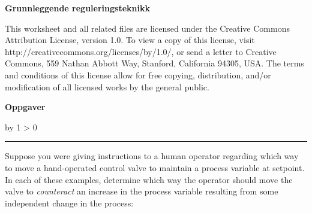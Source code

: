 \documentclass[12pt,a4paper]{article}
\def\oppgave{
            \advance\questnum by 1
            \ifnum \questnum > 0
                 \hrule
                 \vskip 3pt
                 \leftline{Oppgave \the\questnum}
                 \vskip 3pt \fi}
\begin{document}
\centerline{\bf Grunnleggende reguleringsteknikk} \bigskip 
 
This worksheet and all related files are licensed under the Creative Commons Attribution License, version 1.0.  To view a copy of this license, visit http://creativecommons.org/licenses/by/1.0/, or send a letter to Creative Commons, 559 Nathan Abbott Way, Stanford, California 94305, USA.  The terms and conditions of this license allow for free copying, distribution, and/or modification of all licensed works by the general public.



\vfil \eject

\vfil \eject
\vfil \eject
\centerline{\bf Oppgaver}
\vskip 5pt
\oppgave{} 

Suppose you were giving instructions to a human operator regarding which way to move a hand-operated control valve to maintain a process variable at setpoint.  In each of these examples, determine which way the operator should move the valve to {\it counteract} an increase in the process variable resulting from some independent change in the process:

\vskip 30pt
\end{document}
